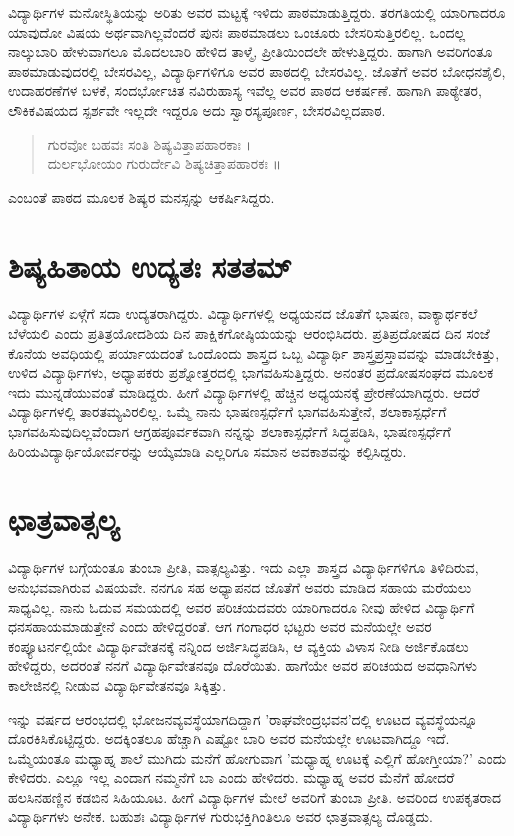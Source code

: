 ವಿದ್ಯಾರ್ಥಿಗಳ ಮನೋಸ್ಥಿತಿಯನ್ನು ಅರಿತು ಅವರ ಮಟ್ಟಕ್ಕೆ ಇಳಿದು ಪಾಠಮಾಡುತ್ತಿದ್ದರು. ತರಗತಿಯಲ್ಲಿ ಯಾರಿಗಾದರೂ ಯಾವುದೋ ವಿಷಯ ಅರ್ಥವಾಗಿಲ್ಲವೆಂದರೆ ಪುನಃ ಪಾಠಮಾಡಲು ಒಂಚೂರು ಬೇಸರಿಸುತ್ತಿರಲಿಲ್ಲ. ಒಂದಲ್ಲ ನಾಲ್ಕುಬಾರಿ ಹೇಳುವಾಗಲೂ ಮೊದಲಬಾರಿ ಹೇಳಿದ ತಾಳ್ಮೆ, ಪ್ರೀತಿಯಿಂದಲೇ ಹೇಳುತ್ತಿದ್ದರು. ಹಾಗಾಗಿ ಅವರಿಗಂತೂ ಪಾಠಮಾಡುವುದರಲ್ಲಿ ಬೇಸರವಿಲ್ಲ, ವಿದ್ಯಾರ್ಥಿಗಳಿಗೂ ಅವರ ಪಾಠದಲ್ಲಿ ಬೇಸರವಿಲ್ಲ. ಜೊತೆಗೆ ಅವರ ಬೋಧನಶೈಲಿ, ಉದಾಹರಣೆಗಳ ಬಳಕೆ, ಸಂದರ್ಭೋಚಿತ ನವಿರುಹಾಸ್ಯ ಇವೆಲ್ಲ ಅವರ ಪಾಠದ ಆಕರ್ಷಣೆ. ಹಾಗಾಗಿ ಪಾಠ್ಯೇತರ, ಲೌಕಿಕವಿಷಯದ ಸ್ಪರ್ಶವೇ ಇಲ್ಲದೇ ಇದ್ದರೂ ಅದು ಸ್ವಾರಸ್ಯಪೂರ್ಣ, ಬೇಸರವಿಲ್ಲದಪಾಠ.
\begin{verse}
ಗುರವೋ ಬಹವಃ ಸಂತಿ ಶಿಷ್ಯವಿತ್ತಾಪಹಾರಕಾಃ ।\\
ದುರ್ಲಭೋಯಂ ಗುರುರ್ದೇವಿ ಶಿಷ್ಯಚಿತ್ತಾಪಹಾರಕಃ ॥
\end{verse}
ಎಂಬಂತೆ ಪಾಠದ ಮೂಲಕ ಶಿಷ್ಯರ ಮನಸ್ಸನ್ನು ಆಕರ್ಷಿಸಿದ್ದರು.

\section*{ಶಿಷ್ಯಹಿತಾಯ ಉದ್ಯತಃ ಸತತಮ್}

ವಿದ್ಯಾರ್ಥಿಗಳ ಏಳ್ಗೆಗೆ ಸದಾ ಉದ್ಯತರಾಗಿದ್ದರು. ವಿದ್ಯಾರ್ಥಿಗಳಲ್ಲಿ ಅಧ್ಯಯನದ ಜೊತೆಗೆ ಭಾಷಣ, ವಾಕ್ಯಾರ್ಥಕಲೆ ಬೆಳೆಯಲಿ ಎಂದು ಪ್ರತಿತ್ರಯೋದಶಿಯ ದಿನ ಪಾಕ್ಷಿಕಗೋಷ್ಠಿಯಯನ್ನು ಆರಂಭಿಸಿದರು. ಪ್ರತಿಪ್ರದೋಷದ ದಿನ ಸಂಜೆ ಕೊನೆಯ ಅವಧಿಯಲ್ಲಿ ಪರ್ಯಾಯದಂತೆ ಒಂದೊಂದು ಶಾಸ್ತ್ರದ ಒಬ್ಬ ವಿದ್ಯಾರ್ಥಿ ಶಾಸ್ತ್ರಪ್ರಸ್ತಾವವನ್ನು ಮಾಡಬೇಕಿತ್ತು, ಉಳಿದ ವಿದ್ಯಾರ್ಥಿಗಳು, ಅಧ್ಯಾಪಕರು ಪ್ರಶ್ನೋತ್ತರದಲ್ಲಿ ಭಾಗವಹಿಸುತ್ತಿದ್ದರು. ಅನಂತರ ಪ್ರದೋಷಸಂಘದ ಮೂಲಕ ಇದು ಮುನ್ನಡೆಯುವಂತೆ ಮಾಡಿದ್ದರು. ಹೀಗೆ ವಿದ್ಯಾರ್ಥಿಗಳಲ್ಲಿ ಹೆಚ್ಚಿನ ಅಧ್ಯಯನಕ್ಕೆ ಪ್ರೇರಣೆಯಾಗಿದ್ದರು. ಆದರೆ ವಿದ್ಯಾರ್ಥಿಗಳಲ್ಲಿ ತಾರತಮ್ಯವಿರಲಿಲ್ಲ. ಒಮ್ಮೆ ನಾನು ಭಾಷಣಸ್ಪರ್ಧೆಗೆ ಭಾಗವಹಿಸುತ್ತೇನೆ, ಶಲಾಕಾಸ್ಪರ್ಧೆಗೆ ಭಾಗವಹಿಸುವುದಿಲ್ಲವೆಂದಾಗ ಆಗ್ರಹಪೂರ್ವಕವಾಗಿ ನನ್ನನ್ನು ಶಲಾಕಾಸ್ಪರ್ಧೆಗೆ ಸಿದ್ಧಪಡಿಸಿ, ಭಾಷಣಸ್ಪರ್ಧೆಗೆ ಹಿರಿಯವಿದ್ಯಾರ್ಥಿಯೋರ್ವರನ್ನು ಆಯ್ಕೆಮಾಡಿ ಎಲ್ಲರಿಗೂ ಸಮಾನ ಅವಕಾಶವನ್ನು ಕಲ್ಪಿಸಿದ್ದರು.

\section*{ಛಾತ್ರವಾತ್ಸಲ್ಯ}

ವಿದ್ಯಾರ್ಥಿಗಳ ಬಗ್ಗೆಯಂತೂ ತುಂಬಾ ಪ್ರೀತಿ, ವಾತ್ಸಲ್ಯವಿತ್ತು. ಇದು ಎಲ್ಲಾ ಶಾಸ್ತ್ರದ ವಿದ್ಯಾರ್ಥಿಗಳಿಗೂ ತಿಳಿದಿರುವ, ಅನುಭವವಾಗಿರುವ ವಿಷಯವೇ. ನನಗೂ ಸಹ ಅಧ್ಯಾಪನದ ಜೊತೆಗೆ ಅವರು ಮಾಡಿದ ಸಹಾಯ ಮರೆಯಲು ಸಾಧ್ಯವಿಲ್ಲ. ನಾನು ಓದುವ ಸಮಯದಲ್ಲಿ ಅವರ ಪರಿಚಯದವರು ಯಾರಿಗಾದರೂ ನೀವು ಹೇಳಿದ ವಿದ್ಯಾರ್ಥಿಗೆ ಧನಸಹಾಯಮಾಡುತ್ತೇನೆ ಎಂದು ಹೇಳಿದ್ದರಂತೆ. ಆಗ ಗಂಗಾಧರ ಭಟ್ಟರು ಅವರ ಮನೆಯಲ್ಲೇ ಅವರ ಕಂಪ್ಯೂಟರ್ನಲ್ಲಿಯೇ ವಿದ್ಯಾರ್ಥಿವೇತನಕ್ಕೆ ನನ್ನಿಂದ ಅರ್ಜಿಸಿದ್ಧಪಡಿಸಿ, ಆ ವ್ಯಕ್ತಿಯ ವಿಳಾಸ ನೀಡಿ ಅರ್ಜಿಕೊಡಲು ಹೇಳಿದ್ದರು, ಅದರಂತೆ ನನಗೆ ವಿದ್ಯಾರ್ಥಿವೇತನವೂ ದೊರೆಯಿತು. ಹಾಗೆಯೇ ಅವರ ಪರಿಚಯದ ಅವಧಾನಿಗಳು ಕಾಲೇಜಿನಲ್ಲಿ ನೀಡುವ ವಿದ್ಯಾರ್ಥಿವೇತನವೂ ಸಿಕ್ಕಿತ್ತು.

ಇನ್ನು ವರ್ಷದ ಆರಂಭದಲ್ಲಿ ಭೋಜನವ್ಯವಸ್ಥೆಯಾಗದಿದ್ದಾಗ ’ರಾಘವೇಂದ್ರಭವನ’ದಲ್ಲಿ ಊಟದ ವ್ಯವಸ್ಥೆಯನ್ನೂ ದೊರಕಿಸಿಕೊಟ್ಟಿದ್ದರು. ಅದಕ್ಕಿಂತಲೂ ಹೆಚ್ಚಾಗಿ ಎಷ್ಟೋ ಬಾರಿ ಅವರ ಮನೆಯಲ್ಲೇ ಊಟವಾಗಿದ್ದೂ ಇದೆ. ಒಮ್ಮೆಯಂತೂ ಮಧ್ಯಾಹ್ನ ಶಾಲೆ ಮುಗಿದು ಮನೆಗೆ ಹೋಗುವಾಗ ’ಮಧ್ಯಾಹ್ನ ಊಟಕ್ಕೆ ಎಲ್ಲಿಗೆ ಹೋಗ್ತೀಯಾ?’ ಎಂದು ಕೇಳಿದರು. ಎಲ್ಲೂ ಇಲ್ಲ ಎಂದಾಗ ನಮ್ಮನೆಗೆ ಬಾ ಎಂದು ಹೇಳಿದರು. ಮಧ್ಯಾಹ್ನ ಅವರ ಮೆನೆಗೆ ಹೋದರೆ ಹಲಸಿನಹಣ್ಣಿನ ಕಡಬಿನ ಸಿಹಿಯೂಟ. ಹೀಗೆ ವಿದ್ಯಾರ್ಥಿಗಳ ಮೇಲೆ ಅವರಿಗೆ ತುಂಬಾ ಪ್ರೀತಿ. ಅವರಿಂದ ಉಪಕೃತರಾದ ವಿದ್ಯಾರ್ಥಿಗಳು ಅನೇಕ. ಬಹುಶಃ ವಿದ್ಯಾರ್ಥಿಗಳ ಗುರುಭಕ್ತಿಗಿಂತಿಲೂ ಅವರ ಛಾತ್ರವಾತ್ಸಲ್ಯ ದೊಡ್ಡದು.

